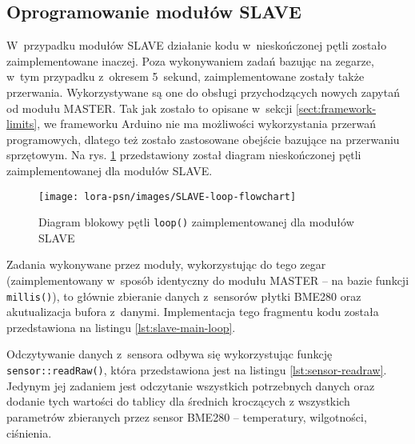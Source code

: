 

\FloatBarrier
\subsection{Oprogramowanie modułów SLAVE\label{sect:firmware-slave}} W~przypadku modułów SLAVE działanie kodu
w~nieskończonej pętli zostało zaimplementowane inaczej. Poza wykonywaniem zadań bazując na zegarze, w~tym przypadku
z~okresem 5~sekund, zaimplementowane zostały także przerwania. Wykorzystywane są one do obsługi przychodzących nowych
zapytań od modułu MASTER. Tak jak zostało to opisane w~sekcji \ref{sect:framework-limits}, we frameworku Arduino nie ma
możliwości wykorzystania przerwań programowych, dlatego też zostało zastosowane obejście bazujące na przerwaniu
sprzętowym. Na rys. \ref{img:slave-flowchart} przedstawiony został diagram nieskończonej pętli zaimplementowanej dla
modułów SLAVE.

\begin{figure}[!htbp]
    \centering
    \texttt{[image: lora-psn/images/SLAVE-loop-flowchart]}
    \caption{\label{img:slave-flowchart}Diagram blokowy pętli \texttt{loop()} zaimplementowanej dla modułów SLAVE}
\end{figure}


Zadania wykonywane przez moduły, wykorzystując do tego zegar (zaimplementowany w~sposób identyczny do modułu MASTER --
na bazie funkcji \texttt{millis()}), to głównie zbieranie danych z~sensorów płytki BME280 oraz akutualizacja bufora
z~danymi. Implementacja tego fragmentu kodu została przedstawiona na listingu \ref{lst:slave-main-loop}.



Odczytywanie danych z~sensora odbywa się wykorzystując funkcję \texttt{sensor::readRaw()}, która przedstawiona jest na
listingu \ref{lst:sensor-readraw}. Jedynym jej zadaniem jest odczytanie wszystkich potrzebnych danych oraz dodanie tych
wartości do tablicy dla średnich kroczących z wszystkich parametrów zbieranych przez sensor BME280 -- temperatury,
wilgotności, ciśnienia.

